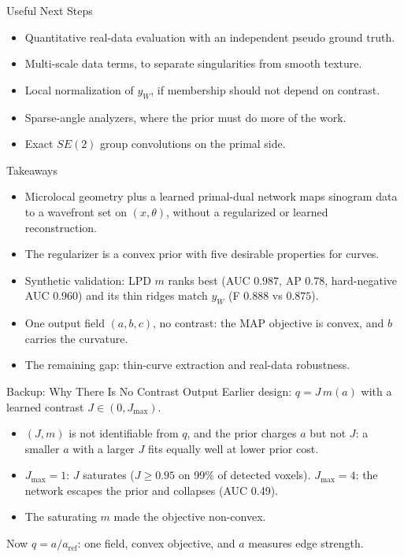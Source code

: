 \documentclass[aspectratio=169]{beamer}
\begin{document}
\begin{frame}{Useful Next Steps}
  \begin{itemize}
    \item Quantitative real-data evaluation with an independent pseudo ground truth.
    \item Multi-scale data terms, to separate singularities from smooth texture.
    \item Local normalization of $y_W$, if membership should not depend on contrast.
    \item Sparse-angle analyzers, where the prior must do more of the work.
    \item Exact $SE(2)$ group convolutions on the primal side.
  \end{itemize}
\end{frame}

\begin{frame}{Takeaways}
  \begin{itemize}
    \item Microlocal geometry plus a learned primal-dual network maps sinogram data to a wavefront set on $(x,\theta)$, without a regularized or learned reconstruction.
    \item The regularizer is a convex prior with five desirable properties for curves.
    \item Synthetic validation: LPD $m$ ranks best (AUC $0.987$, AP $0.78$, hard-negative AUC $0.960$) and its thin ridges match $y_W$ (F $0.888$ vs $0.875$).
    \item One output field $(a,b,c)$, no contrast: the MAP objective is convex, and $b$ carries the curvature.
    \item The remaining gap: thin-curve extraction and real-data robustness.
  \end{itemize}
\end{frame}

\appendix

\begin{frame}{Backup: Why There Is No Contrast Output}
  Earlier design: $q=J\,m(a)$ with a learned contrast $J\in(0,J_{\max})$.
  \begin{itemize}
    \item $(J,m)$ is not identifiable from $q$, and the prior charges $a$ but not $J$: a smaller $a$ with a larger $J$ fits equally well at lower prior cost.
    \item $J_{\max}=1$: $J$ saturates ($J\ge0.95$ on 99\% of detected voxels). $J_{\max}=4$: the network escapes the prior and collapses (AUC 0.49).
    \item The saturating $m$ made the objective non-convex.
  \end{itemize}
  Now $q=a/a_\mathrm{ref}$: one field, convex objective, and $a$ measures edge strength.
\end{frame}
\end{document}
